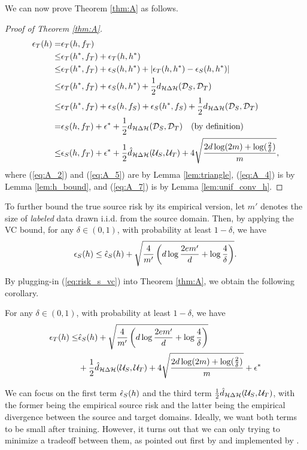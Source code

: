 We can now prove Theorem \ref{thm:A} as follows.

\begin{proof}[Proof of Theorem \ref{thm:A}]
  \begin{align}
     \epsilon_{T}(h) 
    =& \epsilon_{T}(h, f_T) \label{eq:A_1}\\
    \leq& \epsilon_{T}(h^*, f_T) + \epsilon_{T}(h, h^*) \label{eq:A_2}\\
    \leq& \epsilon_{T}(h^*, f_T) + \epsilon_{S}(h, h^*) + \left \lvert \epsilon_{T}(h, h^*) - \epsilon_{S}(h, h^*) \right \rvert \label{eq:A_3}\\
    \leq& \epsilon_{T}(h^*, f_T) + \epsilon_{S}(h, h^*) + \frac{1}{2} d_{\mathcal{H} \Delta \mathcal{H}}(\mathcal{D}_S, \mathcal{D}_T) \label{eq:A_4}\\
    \leq& \epsilon_{T}(h^*, f_T) + \epsilon_{S}(h, f_S) + \epsilon_{S}(h^*, f_S) + \frac{1}{2} d_{\mathcal{H} \Delta \mathcal{H}}(\mathcal{D}_S, \mathcal{D}_T) \label{eq:A_5}\\
    =   & \epsilon_{S}(h, f_T) + \epsilon^* + \frac{1}{2} d_{\mathcal{H} \Delta \mathcal{H}}(\mathcal{D}_S, \mathcal{D}_T) \text{\quad (by definition)} \label{eq:A_6}\\
    \leq& \epsilon_{S}(h, f_T) + \epsilon^* + \frac{1}{2} \hat{d}_{\mathcal{H} \Delta \mathcal{H}}(\mathcal{U}_S, \mathcal{U}_T)
          + 4 \sqrt{\frac{2d \log(2m) + \log(\frac{2}{\delta})}{m}}, \label{eq:A_7}
  \end{align}
  where (\ref{eq:A_2}) and (\ref{eq:A_5}) are by Lemma \ref{lem:triangle}, (\ref{eq:A_4}) is by Lemma \ref{lem:h_bound}, and (\ref{eq:A_7}) is by Lemma \ref{lem:unif_conv_h}.
\end{proof}

To further bound the true source risk by its empirical version, let $m'$ denotes the size of \textit{labeled} data drawn i.i.d. from the source domain. Then, by applying the VC bound, for any $\delta \in (0,1)$, with probability at least $1 - \delta$, we have
\begin{equation}\label{eq:risk_s_vc}
  \epsilon_{S}(h) \leq \hat{\epsilon}_{S}(h) + \sqrt{\frac{4}{m'}\left( d \log \frac{2em'}{d} + \log \frac{4}{\delta} \right)}.
\end{equation}

By plugging-in (\ref{eq:risk_s_vc}) into Theorem \ref{thm:A}, we obtain the following corollary.

\begin{corollary}\label{thm:B}
  For any $\delta \in (0,1)$, with probability at least $1 - \delta$, we have
  \begin{equation}\label{eq:B}
    \begin{aligned}
      \epsilon_{T}(h) \leq&
      \hat{\epsilon}_{S}(h) + \sqrt{\frac{4}{m'}\left( d \log \frac{2em'}{d} + \log \frac{4}{\delta} \right)} \\
      & + \frac{1}{2} \hat{d}_{\mathcal{H} \Delta \mathcal{H}}(\mathcal{U}_S, \mathcal{U}_T)
      + 4 \sqrt{\frac{2d \log(2m) + \log(\frac{2}{\delta})}{m}} 
      + \epsilon^*
    \end{aligned}
  \end{equation}
\end{corollary}

We can focus on the first term $\hat{\epsilon}_{S}(h)$ and the third term $\frac{1}{2} \hat{d}_{\mathcal{H} \Delta \mathcal{H}}(\mathcal{U}_S, \mathcal{U}_T)$, with the former being the empirical source risk and the latter being the empirical divergence between the source and target domains. Ideally, we want both terms to be small after training. However, it turns out that we can only trying to minimize a tradeoff between them, as pointed out first by \cite{BenDavid2006} and implemented by \cite{Ganin2016}.
